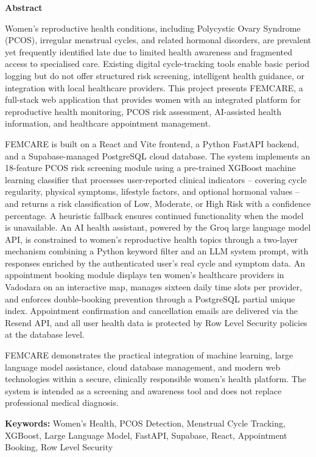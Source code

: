 \thispagestyle{empty}
\newpage
\cleardoublepage{}
{}
\begin{center}
{\Large \bf Abstract}\\
\end{center}
\vspace{10pt}

Women's reproductive health conditions, including Polycystic Ovary Syndrome (PCOS), irregular menstrual cycles, and related hormonal disorders, are prevalent yet frequently identified late due to limited health awareness and fragmented access to specialised care. Existing digital cycle-tracking tools enable basic period logging but do not offer structured risk screening, intelligent health guidance, or integration with local healthcare providers. This project presents FEMCARE, a full-stack web application that provides women with an integrated platform for reproductive health monitoring, PCOS risk assessment, AI-assisted health information, and healthcare appointment management.

FEMCARE is built on a React and Vite frontend, a Python FastAPI backend, and a Supabase-managed PostgreSQL cloud database. The system implements an 18-feature PCOS risk screening module using a pre-trained XGBoost machine learning classifier that processes user-reported clinical indicators -- covering cycle regularity, physical symptoms, lifestyle factors, and optional hormonal values -- and returns a risk classification of Low, Moderate, or High Risk with a confidence percentage. A heuristic fallback ensures continued functionality when the model is unavailable. An AI health assistant, powered by the Groq large language model API, is constrained to women's reproductive health topics through a two-layer mechanism combining a Python keyword filter and an LLM system prompt, with responses enriched by the authenticated user's real cycle and symptom data. An appointment booking module displays ten women's healthcare providers in Vadodara on an interactive map, manages sixteen daily time slots per provider, and enforces double-booking prevention through a PostgreSQL partial unique index. Appointment confirmation and cancellation emails are delivered via the Resend API, and all user health data is protected by Row Level Security policies at the database level.

FEMCARE demonstrates the practical integration of machine learning, large language model assistance, cloud database management, and modern web technologies within a secure, clinically responsible women's health platform. The system is intended as a screening and awareness tool and does not replace professional medical diagnosis.

\vspace{10pt}
\noindent\textbf{Keywords:} Women's Health, PCOS Detection, Menstrual Cycle Tracking, XGBoost, Large Language Model, FastAPI, Supabase, React, Appointment Booking, Row Level Security

